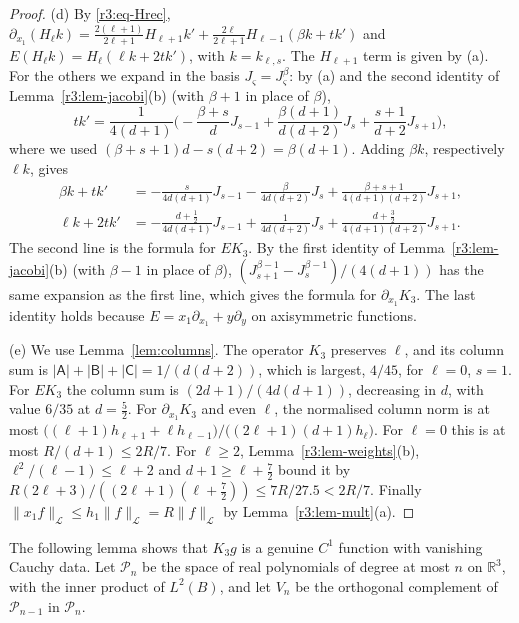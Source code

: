 \documentclass[11pt]{amsart}
\theoremstyle{definition}
\theoremstyle{remark}
\numberwithin{equation}{section}
\newcommand{\R}{\mathbb{R}}
\newcommand{\nrm}[1]{\lVert #1\rVert}
\begin{document}
\begin{proof}
(d) By \eqref{r3:eq-Hrec}, $\partial_{x_1}(H_\ell k)=\frac{2(\ell+1)}{2\ell+1}H_{\ell+1}k'+\frac{2\ell}{2\ell+1}H_{\ell-1}(\beta k+tk')$ and $E(H_\ell k)=H_\ell(\ell k+2tk')$, with $k=k_{\ell,s}$. The $H_{\ell+1}$ term is given by (a). For the others we expand in the basis $J_\varsigma=J^\beta_\varsigma$: by (a) and the second identity of Lemma~\ref{r3:lem-jacobi}(b) (with $\beta+1$ in place of $\beta$),
\[
tk'=\frac1{4(d+1)}\Big(-\frac{\beta+s}dJ_{s-1}+\frac{\beta(d+1)}{d(d+2)}J_s+\frac{s+1}{d+2}J_{s+1}\Big),
\]
where we used $(\beta+s+1)d-s(d+2)=\beta(d+1)$. Adding $\beta k$, respectively $\ell k$, gives
\begin{align*}
\beta k+tk'&=-\frac{s}{4d(d+1)}J_{s-1}-\frac{\beta}{4d(d+2)}J_s+\frac{\beta+s+1}{4(d+1)(d+2)}J_{s+1},\\
\ell k+2tk'&=-\frac{d+\frac12}{4d(d+1)}J_{s-1}+\frac1{4d(d+2)}J_s+\frac{d+\frac32}{4(d+1)(d+2)}J_{s+1} .
\end{align*}
The second line is the formula for $EK_3$. By the first identity of Lemma~\ref{r3:lem-jacobi}(b) (with $\beta-1$ in place of $\beta$), $(J^{\beta-1}_{s+1}-J^{\beta-1}_s)/(4(d+1))$ has the same expansion as the first line, which gives the formula for $\partial_{x_1}K_3$. The last identity holds because $E=x_1\partial_{x_1}+y\partial_y$ on axisymmetric functions.

(e) We use Lemma~\ref{lem:columns}. The operator $K_3$ preserves $\ell$, and its column sum is $|\mathsf A|+|\mathsf B|+|\mathsf C|=1/(d(d+2))$, which is largest, $4/45$, for $\ell=0$, $s=1$. For $EK_3$ the column sum is $(2d+1)/(4d(d+1))$, decreasing in $d$, with value $6/35$ at $d=\frac52$. For $\partial_{x_1}K_3$ and even $\ell$, the normalised column norm is at most $\big((\ell+1)h_{\ell+1}+\ell h_{\ell-1}\big)/\big((2\ell+1)(d+1)h_\ell\big)$. For $\ell=0$ this is at most $R/(d+1)\leq2R/7$. For $\ell\geq2$, Lemma~\ref{r3:lem-weights}(b), $\ell^2/(\ell-1)\leq\ell+2$ and $d+1\geq\ell+\frac72$ bound it by $R(2\ell+3)/((2\ell+1)(\ell+\frac72))\leq7R/27.5<2R/7$. Finally $\nrm{x_1f}_{\mathcal L}\leq h_1\nrm f_{\mathcal L}=R\nrm f_{\mathcal L}$ by Lemma~\ref{r3:lem-mult}(a).
\end{proof}

The following lemma shows that $K_3g$ is a genuine $C^1$ function with vanishing Cauchy data. Let $\mathcal P_n$ be the space of real polynomials of degree at most $n$ on $\R^3$, with the inner product of $L^2(B)$, and let $V_n$ be the orthogonal complement of $\mathcal P_{n-1}$ in $\mathcal P_n$.
\end{document}
